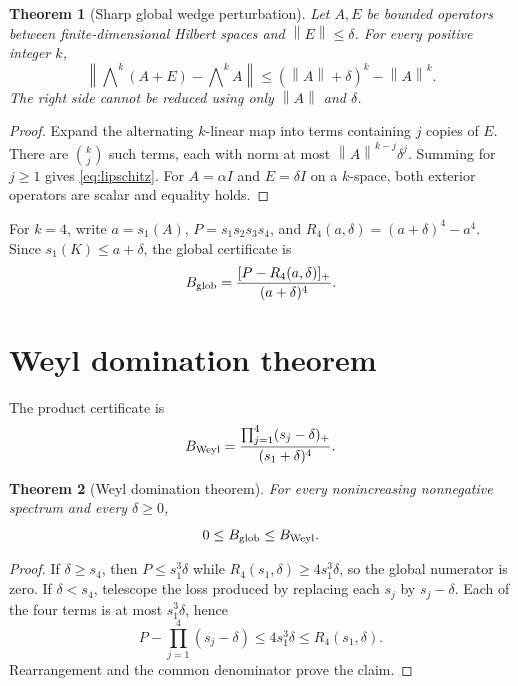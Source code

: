 \documentclass[11pt]{article}
\newtheorem{theorem}{Theorem}
\newcommand{\norm}[1]{\left\lVert#1\right\rVert}
\newcommand{\wed}{\mathop{\bigwedge}\nolimits}
\begin{document}
\begin{theorem}[Sharp global wedge perturbation]
Let $A,E$ be bounded operators between finite-dimensional Hilbert spaces and
$\norm E\leq\delta$.  For every positive integer $k$,
\begin{equation}\label{eq:lipschitz}
 \norm{\wed^k(A+E)-\wed^kA}
 \leq (\norm A+\delta)^k-\norm A^k.
\end{equation}
The right side cannot be reduced using only $\norm A$ and $\delta$.
\end{theorem}
\begin{proof}
Expand the alternating $k$-linear map into terms containing $j$ copies of
$E$.  There are $\binom{k}{j}$ such terms, each with norm at most
$\norm A^{k-j}\delta^j$.  Summing for $j\geq1$ gives
\eqref{eq:lipschitz}.  For $A=\alpha I$ and $E=\delta I$ on a $k$-space,
both exterior operators are scalar and equality holds.
\end{proof}

For $k=4$, write $a=s_1(A)$, $P=s_1s_2s_3s_4$, and
$R_4(a,\delta)=(a+\delta)^4-a^4$.  Since
$s_1(K)\leq a+\delta$, the global certificate is
\begin{equation}\label{eq:global}
 B_{\rm glob}=
 \frac{[P-R_4(a,\delta)]_+}{(a+\delta)^4}.
\end{equation}

\section{Weyl domination theorem}
The product certificate is
\begin{equation}\label{eq:weyl}
 B_{\rm Weyl}=\frac{\prod_{j=1}^4(s_j-\delta)_+}{(s_1+\delta)^4}.
\end{equation}

\begin{theorem}[Weyl domination theorem]\label{thm:domination}
For every nonincreasing nonnegative spectrum and every $\delta\geq0$,
\[
 0\leq B_{\rm glob}\leq B_{\rm Weyl}.
\]
\end{theorem}
\begin{proof}
If $\delta\geq s_4$, then $P\leq s_1^3\delta$ while
$R_4(s_1,\delta)\geq4s_1^3\delta$, so the global numerator is zero.
If $\delta<s_4$, telescope the loss produced by replacing each $s_j$ by
$s_j-\delta$.  Each of the four terms is at most $s_1^3\delta$, hence
\[
 P-\prod_{j=1}^4(s_j-\delta)\leq4s_1^3\delta
 \leq R_4(s_1,\delta).
\]
Rearrangement and the common denominator prove the claim.
\end{proof}
\end{document}
